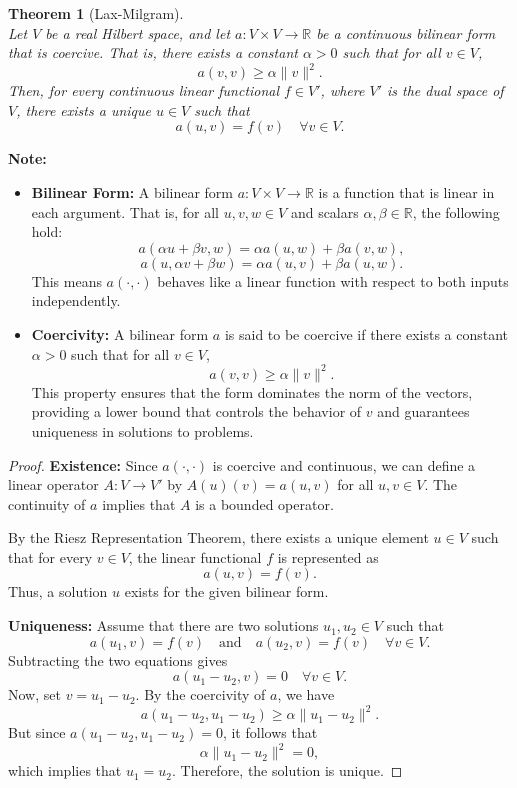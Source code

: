 \documentclass[12pt, reqno]{amsart}
\newtheorem{theorem}{Theorem}[section]
\theoremstyle{definition}
\numberwithin{equation}{section}
\newcommand{\dR}{{\mathbb R}}
\begin{document}
\begin{theorem}[Lax-Milgram] \hfill \\
Let $V$ be a real Hilbert space, and let $a: V \times V \to \dR$ be a continuous bilinear form that is coercive. That is, there exists a constant $\alpha > 0$ such that for all $v \in V$,
\[
a(v, v) \geq \alpha \|v\|^2.
\]
Then, for every continuous linear functional $f \in V'$, where $V'$ is the dual space of $V$, there exists a unique $u \in V$ such that
\[
a(u, v) = f(v) \quad \forall v \in V.
\]
\end{theorem}
\pagebreak
\textbf{Note:}
\begin{itemize}
    \item \textbf{Bilinear Form:} A bilinear form $a: V \times V \to \dR$ is a function that is linear in each argument. That is, for all $u, v, w \in V$ and scalars $\alpha, \beta \in \dR$, the following hold:
    \[
    a(\alpha u + \beta v, w) = \alpha a(u, w) + \beta a(v, w),
    \]
    \[
    a(u, \alpha v + \beta w) = \alpha a(u, v) + \beta a(u, w).
    \]
    This means $a(\cdot, \cdot)$ behaves like a linear function with respect to both inputs independently.
    
    \item \textbf{Coercivity:} A bilinear form $a$ is said to be coercive if there exists a constant $\alpha > 0$ such that for all $v \in V$,
    \[
    a(v, v) \geq \alpha \|v\|^2.
    \]
    This property ensures that the form dominates the norm of the vectors, providing a lower bound that controls the behavior of $v$ and guarantees uniqueness in solutions to problems.
\end{itemize}

\begin{proof}
\textbf{Existence:} Since $a(\cdot, \cdot)$ is coercive and continuous, we can define a linear operator $A: V \to V'$ by $A(u)(v) = a(u, v)$ for all $u, v \in V$. The continuity of $a$ implies that $A$ is a bounded operator.

By the Riesz Representation Theorem, there exists a unique element $u \in V$ such that for every $v \in V$, the linear functional $f$ is represented as
\[
a(u, v) = f(v).
\]
Thus, a solution $u$ exists for the given bilinear form.

\textbf{Uniqueness:} Assume that there are two solutions $u_1, u_2 \in V$ such that
\[
a(u_1, v) = f(v) \quad \text{and} \quad a(u_2, v) = f(v) \quad \forall v \in V.
\]
Subtracting the two equations gives
\[
a(u_1 - u_2, v) = 0 \quad \forall v \in V.
\]
Now, set $v = u_1 - u_2$. By the coercivity of $a$, we have
\[
a(u_1 - u_2, u_1 - u_2) \geq \alpha \|u_1 - u_2\|^2.
\]
But since $a(u_1 - u_2, u_1 - u_2) = 0$, it follows that
\[
\alpha \|u_1 - u_2\|^2 = 0,
\]
which implies that $u_1 = u_2$. Therefore, the solution is unique.
\end{proof}
\end{document}
